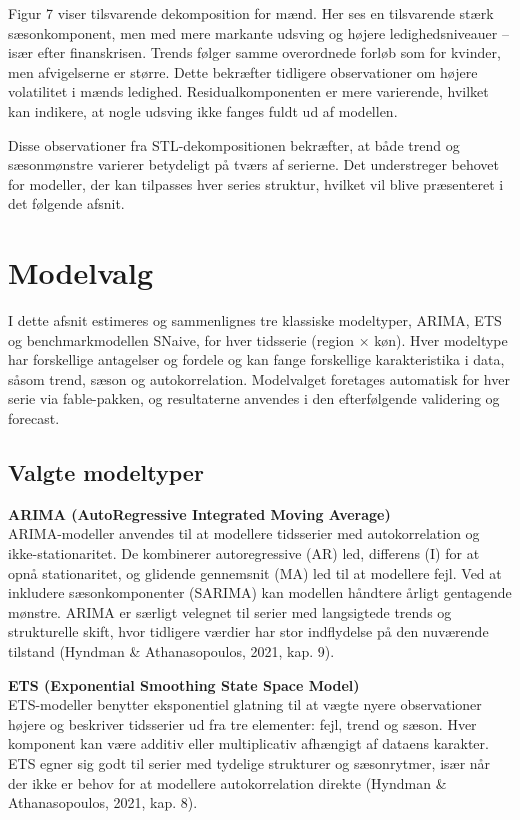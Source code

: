 \documentclass[
]{article}
\begin{document}
Figur 7 viser tilsvarende dekomposition for mænd. Her ses en tilsvarende
stærk sæsonkomponent, men med mere markante udsving og højere
ledighedsniveauer -- især efter finanskrisen. Trends følger samme
overordnede forløb som for kvinder, men afvigelserne er større. Dette
bekræfter tidligere observationer om højere volatilitet i mænds
ledighed. Residualkomponenten er mere varierende, hvilket kan indikere,
at nogle udsving ikke fanges fuldt ud af modellen.

Disse observationer fra STL-dekompositionen bekræfter, at både trend og
sæsonmønstre varierer betydeligt på tværs af serierne. Det understreger
behovet for modeller, der kan tilpasses hver series struktur, hvilket
vil blive præsenteret i det følgende afsnit.

\section{Modelvalg}\label{modelvalg}

I dette afsnit estimeres og sammenlignes tre klassiske modeltyper,
ARIMA, ETS og benchmarkmodellen SNaive, for hver tidsserie (region ×
køn). Hver modeltype har forskellige antagelser og fordele og kan fange
forskellige karakteristika i data, såsom trend, sæson og
autokorrelation. Modelvalget foretages automatisk for hver serie via
fable-pakken, og resultaterne anvendes i den efterfølgende validering og
forecast.

\subsection{Valgte modeltyper}\label{valgte-modeltyper}

\textbf{ARIMA (AutoRegressive Integrated Moving Average)}\\
ARIMA-modeller anvendes til at modellere tidsserier med autokorrelation
og ikke-stationaritet. De kombinerer autoregressive (AR) led, differens
(I) for at opnå stationaritet, og glidende gennemsnit (MA) led til at
modellere fejl. Ved at inkludere sæsonkomponenter (SARIMA) kan modellen
håndtere årligt gentagende mønstre. ARIMA er særligt velegnet til serier
med langsigtede trends og strukturelle skift, hvor tidligere værdier har
stor indflydelse på den nuværende tilstand (Hyndman \& Athanasopoulos,
2021, kap. 9).

\textbf{ETS (Exponential Smoothing State Space Model)}\\
ETS-modeller benytter eksponentiel glatning til at vægte nyere
observationer højere og beskriver tidsserier ud fra tre elementer: fejl,
trend og sæson. Hver komponent kan være additiv eller multiplicativ
afhængigt af dataens karakter. ETS egner sig godt til serier med
tydelige strukturer og sæsonrytmer, især når der ikke er behov for at
modellere autokorrelation direkte (Hyndman \& Athanasopoulos, 2021, kap.
8).
\end{document}
